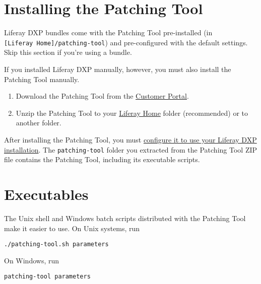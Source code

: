 \section{Installing the Patching
Tool}\label{installing-the-patching-tool}

Liferay DXP bundles come with the Patching Tool pre-installed (in
\texttt{{[}Liferay\ Home{]}/patching-tool}) and pre-configured with the
default settings. Skip this section if you're using a bundle.

If you installed Liferay DXP manually, however, you must also install
the Patching Tool manually.

\begin{enumerate}
\def\labelenumi{\arabic{enumi}.}
\item
  Download the Patching Tool from the
  \href{https://customer.liferay.com/downloads?p_p_id=com_liferay_osb_customer_downloads_display_web_DownloadsDisplayPortlet&_com_liferay_osb_customer_downloads_display_web_DownloadsDisplayPortlet_productAssetCategoryId=118191019&_com_liferay_osb_customer_downloads_display_web_DownloadsDisplayPortlet_fileTypeAssetCategoryId=118191066}{Customer
  Portal}.
\item
  Unzip the Patching Tool to your
  \href{/docs/7-2/deploy/-/knowledge_base/d/liferay-home}{Liferay Home}
  folder (recommended) or to another folder.
\end{enumerate}

After installing the Patching Tool, you must
\href{/docs/7-2/deploy/-/knowledge_base/d/configuring-the-patching-tool}{configure
it to use your Liferay DXP installation}. The \texttt{patching-tool}
folder you extracted from the Patching Tool ZIP file contains the
Patching Tool, including its executable scripts.

\section{Executables}\label{executables}

The Unix shell and Windows batch scripts distributed with the Patching
Tool make it easier to use. On Unix systems, run

\begin{verbatim}
./patching-tool.sh parameters
\end{verbatim}

On Windows, run

\begin{verbatim}
patching-tool parameters
\end{verbatim}

